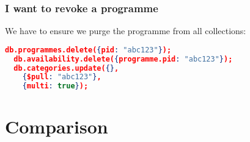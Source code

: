 \documentclass[11pt,a4paper]{article}
\begin{document}
\subsubsection{I want to revoke a programme}

We have to ensure we purge the programme from all collections:

\begin{lstlisting}[language=json]
  db.programmes.delete({pid: "abc123"});
  db.availability.delete({programme.pid: "abc123"});
  db.categories.update({},
    {$pull: "abc123"},
    {multi: true});
\end{lstlisting}

\section{Comparison}



\end{document}

